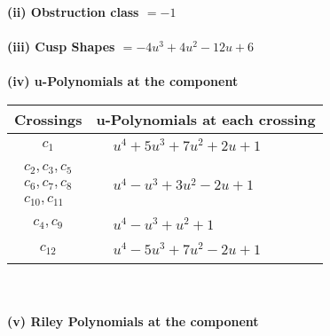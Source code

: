 \documentclass[1p]{elsarticle_modified}
\theoremstyle{definition}
\begin{document}
\flushleft \textbf{(ii) Obstruction class $= -1$}\\~\\
\flushleft \textbf{(iii) Cusp Shapes $= -4 u^3+4 u^2-12 u+6$}\\~\\
\newpage\renewcommand{\arraystretch}{1}
\flushleft \textbf{(iv) u-Polynomials at the component}\newline \\
\begin{tabular}{m{50pt}|m{274pt}}
Crossings & \hspace{64pt}u-Polynomials at each crossing \\
\hline $$\begin{aligned}c_{1}\end{aligned}$$&$\begin{aligned}
&u^4+5 u^3+7 u^2+2 u+1
\end{aligned}$\\
\hline $$\begin{aligned}c_{2},c_{3},c_{5}\\c_{6},c_{7},c_{8}\\c_{10},c_{11}\end{aligned}$$&$\begin{aligned}
&u^4- u^3+3 u^2-2 u+1
\end{aligned}$\\
\hline $$\begin{aligned}c_{4},c_{9}\end{aligned}$$&$\begin{aligned}
&u^4- u^3+u^2+1
\end{aligned}$\\
\hline $$\begin{aligned}c_{12}\end{aligned}$$&$\begin{aligned}
&u^4-5 u^3+7 u^2-2 u+1
\end{aligned}$\\
\hline
\end{tabular}\\~\\
\newpage\renewcommand{\arraystretch}{1}
\flushleft \textbf{(v) Riley Polynomials at the component}\newline \\
\end{document}
